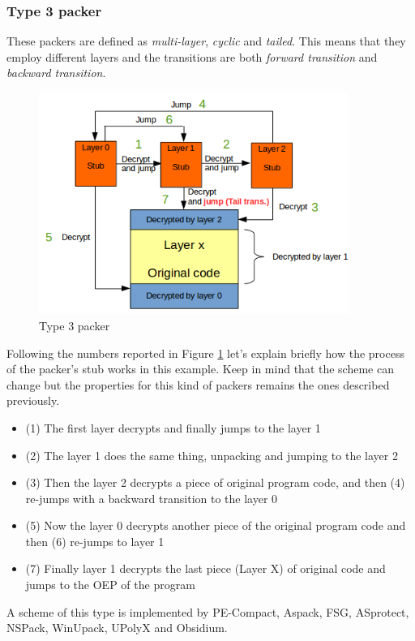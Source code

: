 \subsubsection{Type 3 packer}
These packers are defined as \textit{multi-layer}, \textit{cyclic} and \textit{tailed}. This means that they employ different layers and the transitions are both \textit{forward transition} and \textit{backward transition}.\\
\begin{figure}[!ht]
	\begin{center}
   		\includegraphics[width=0.9\textwidth]{pictures/packer_type_3.png} 
	\end{center}
	\caption{Type 3 packer}
	\label{Type 3 packer}
\end{figure}
Following the numbers reported in Figure \ref{Type 3 packer} let's explain briefly how the process of the packer's stub works in this example. Keep in mind that the scheme can change but the properties for this kind of packers remains the ones described previously.
\begin{itemize}
\item (1) The first layer decrypts and finally jumps to the layer 1
\item (2) The layer 1 does the same thing, unpacking and jumping to the layer 2
\item (3) Then the layer 2 decrypts a piece of original program code, and then (4) re-jumps with a backward transition to the layer 0
\item (5) Now the layer 0 decrypts another piece of the original program code and then (6) re-jumps to layer 1
\item (7) Finally layer 1 decrypts the last piece (Layer X) of original code and jumps to the \ac{OEP} of the program
\end{itemize}
A scheme of this type is implemented by PE-Compact, Aspack, FSG, ASprotect, NSPack, WinUpack, UPolyX and Obsidium.

